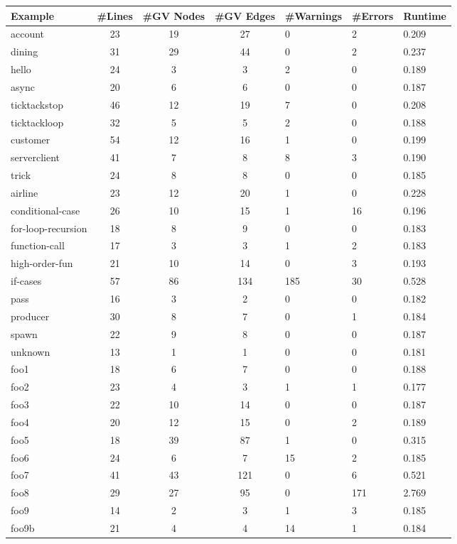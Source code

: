 \begin{table}[h]
\centering
\begin{tabular}{lccc}
\hline
Example & #Lines & #GV Nodes & #GV Edges & #Warnings & #Errors & Runtime \\ 
\hline
account & 23 & 19 & 27 & 0 & 2 & 0.209 \\ 
dining & 31 & 29 & 44 & 0 & 2 & 0.237 \\ 
hello & 24 & 3 & 3 & 2 & 0 & 0.189 \\ 
async & 20 & 6 & 6 & 0 & 0 & 0.187 \\ 
ticktackstop & 46 & 12 & 19 & 7 & 0 & 0.208 \\ 
ticktackloop & 32 & 5 & 5 & 2 & 0 & 0.188 \\ 
customer & 54 & 12 & 16 & 1 & 0 & 0.199 \\ 
serverclient & 41 & 7 & 8 & 8 & 3 & 0.190 \\ 
trick & 24 & 8 & 8 & 0 & 0 & 0.185 \\ 
airline & 23 & 12 & 20 & 1 & 0 & 0.228 \\ 
conditional-case & 26 & 10 & 15 & 1 & 16 & 0.196 \\ 
for-loop-recursion & 18 & 8 & 9 & 0 & 0 & 0.183 \\ 
function-call & 17 & 3 & 3 & 1 & 2 & 0.183 \\ 
high-order-fun & 21 & 10 & 14 & 0 & 3 & 0.193 \\ 
if-cases & 57 & 86 & 134 & 185 & 30 & 0.528 \\ 
pass & 16 & 3 & 2 & 0 & 0 & 0.182 \\ 
producer & 30 & 8 & 7 & 0 & 1 & 0.184 \\ 
spawn & 22 & 9 & 8 & 0 & 0 & 0.187 \\ 
unknown & 13 & 1 & 1 & 0 & 0 & 0.181 \\ 
foo1 & 18 & 6 & 7 & 0 & 0 & 0.188 \\ 
foo2 & 23 & 4 & 3 & 1 & 1 & 0.177 \\ 
foo3 & 22 & 10 & 14 & 0 & 0 & 0.187 \\ 
foo4 & 20 & 12 & 15 & 0 & 2 & 0.189 \\ 
foo5 & 18 & 39 & 87 & 1 & 0 & 0.315 \\ 
foo6 & 24 & 6 & 7 & 15 & 2 & 0.185 \\ 
foo7 & 41 & 43 & 121 & 0 & 6 & 0.521 \\ 
foo8 & 29 & 27 & 95 & 0 & 171 & 2.769 \\ 
foo9 & 14 & 2 & 3 & 1 & 3 & 0.185 \\ 
foo9b & 21 & 4 & 4 & 14 & 1 & 0.184 \\ 

\end{tabular}
\end{table}
